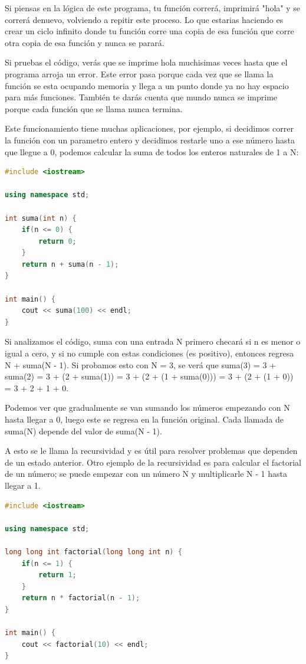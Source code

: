 \documentclass{article}
\begin{document}
Si piensas en la lógica de este programa, tu función correrá, imprimirá "hola" y se correrá denuevo, volviendo a repitir este proceso. Lo que estarias haciendo es crear un ciclo infinito donde tu función corre una copia de esa función que corre otra copia de esa función y nunca se parará.

Si pruebas el código, verás que se imprime hola muchisimas veces hasta que el programa arroja un error. Este error pasa porque cada vez que se llama la función se esta ocupando memoria y llega a un punto donde ya no hay espacio para más funciones. También te darás cuenta que mundo nunca se imprime porque cada función que se llama nunca termina.

Este funcionamiento tiene muchas aplicaciones, por ejemplo, si decidimos correr la función con un parametro entero y decidimos restarle uno a ese número hasta que llegue a 0, podemos calcular la suma de todos los enteros naturales de 1 a N:

\begin{lstlisting}[language=C++, caption=Suma de enteros]
#include <iostream>

using namespace std;

int suma(int n) {
    if(n <= 0) {
        return 0;
    }
    return n + suma(n - 1);
}

int main() {
    cout << suma(100) << endl;
}
\end{lstlisting}

Si analizamos el código, suma con una entrada N primero checará si n es menor o igual a cero, y si no cumple con estas condiciones (es positivo), entonces regresa N + suma(N - 1). Si probamos esto con N = 3, se verá que suma(3) = 3 + suma(2) = 3 + (2 + suma(1)) = 3 + (2 + (1 + suma(0))) = 3 + (2 + (1 + 0)) = 3 + 2 + 1 + 0.

Podemos ver que gradualmente se van sumando los números empezando con N hasta llegar a 0, luego este se regresa en la función original. Cada llamada de suma(N) depende del valor de suma(N - 1).

A esto se le llama la recursividad y es útil para resolver problemas que dependen de un estado anterior. Otro ejemplo de la recursividad es para calcular el factorial de un número; se puede empezar con un número N y multiplicarle N - 1 hasta llegar a 1.

\begin{lstlisting}[language=C++, caption=Factorial recursivo]
#include <iostream>

using namespace std;

long long int factorial(long long int n) {
    if(n <= 1) {
        return 1;
    }
    return n * factorial(n - 1);
}

int main() {
    cout << factorial(10) << endl;
}
\end{lstlisting}
\end{document}
